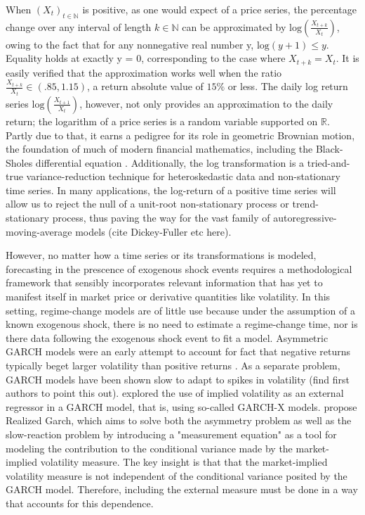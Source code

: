 \documentclass[11pt]{article}
\theoremstyle{definition}
\begin{document}
When $(X_{t})_{t\in\mathbb{N}}$ is positive, as one would expect of a price series, the percentage change over any interval of length $k\in\mathbb{N}$ can be approximated by $\text{log}(\frac{X_{t+k}}{X_{t}})$, owing to the fact that for any nonnegative real number y, $\text{log}(y+1)\leq y$.  Equality holds at exactly y = 0, corresponding to the case where $X_{t+k} = X_{t}$.  It is easily verified that the approximation works well when the ratio $\frac{X_{t+k}}{X_{t}} \in (.85,1.15)$, a return absolute value of $15\%$ or less.  The daily log return series $\text{log}(\frac{X_{t+1}}{X_{t}})$, however, not only provides an approximation to the daily return; the logarithm of a price series is a random variable supported on $\mathbb{R}$.  Partly due to that, it earns a pedigree for its role in geometric Brownian motion, the foundation of much of modern financial mathematics, including the Black-Sholes differential equation \citep{tsay2005analysis}.  Additionally, the log transformation is a tried-and-true variance-reduction technique for heteroskedastic data \citep{faraway2016extending} and non-stationary time series.  In many applications, the log-return of a positive time series will allow us to reject the null of a unit-root non-stationary process or trend-stationary process, thus paving the way for the vast family of autoregressive-moving-average models (cite Dickey-Fuller etc here).

However, no matter how a time series or its transformations is modeled, forecasting in the prescence of exogenous shock events requires a methodological framework that sensibly incorporates relevant information that has yet to manifest itself in market price or derivative quantities like volatility.  In this setting, regime-change models are of little use because under the assumption of a known exogenous shock, there is no need to estimate a regime-change time, nor is there data following the exogenous shock event to fit a model.  Asymmetric GARCH models were an early attempt to account for fact that negative returns typically beget larger volatility than positive returns \citep{hansen2012realized}.  As a separate problem, GARCH models have been shown slow to adapt to spikes in volatility (find first authors to point this out).  \citet{engle2002new} explored the use of implied volatility as an external regressor in a GARCH model, that is, using so-called GARCH-X models. \citet{hansen2012realized} propose Realized Garch, which aims to solve both the asymmetry problem as well as the slow-reaction problem by introducing a "measurement equation" as a tool for modeling the contribution to the conditional variance made by the market-implied volatility measure.  The key insight is that that the market-implied volatility measure is not independent of the conditional variance posited by the GARCH model.  Therefore, including the external measure must be done in a way that accounts for this dependence.
\end{document}
